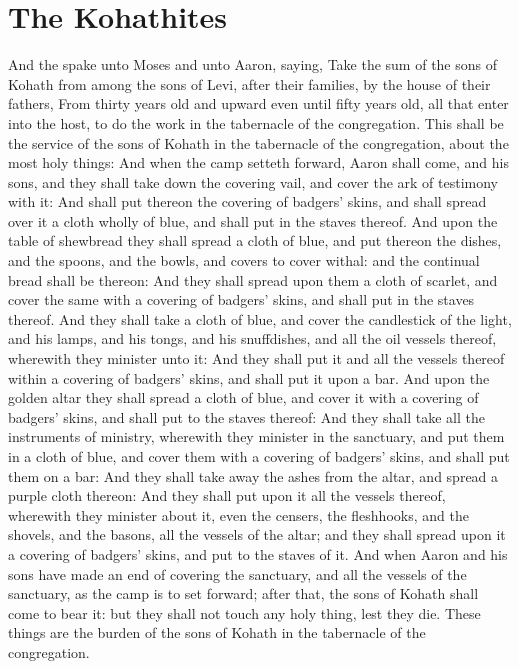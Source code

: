 \section*{The Kohathites}
\begin{biblechapter} %
\verse And the \LORD spake unto Moses and unto Aaron, saying,
\verse Take the sum of the sons of Kohath from among the sons of Levi, after their families, by the house of their fathers,
\verse From thirty years old and upward even until fifty years old, all that enter into the host, to do the work in the tabernacle of the congregation.
\verse This shall be the service of the sons of Kohath in the tabernacle of the congregation, about the most holy things:
\verse And when the camp setteth forward, Aaron shall come, and his sons, and they shall take down the covering vail, and cover the ark of testimony with it:
\verse And shall put thereon the covering of badgers' skins, and shall spread over it a cloth wholly of blue, and shall put in the staves thereof.
\verse And upon the table of shewbread they shall spread a cloth of blue, and put thereon the dishes, and the spoons, and the bowls, and covers to cover withal: and the continual bread shall be thereon:
\verse And they shall spread upon them a cloth of scarlet, and cover the same with a covering of badgers' skins, and shall put in the staves thereof.
\verse And they shall take a cloth of blue, and cover the candlestick of the light, and his lamps, and his tongs, and his snuffdishes, and all the oil vessels thereof, wherewith they minister unto it:
\verse And they shall put it and all the vessels thereof within a covering of badgers' skins, and shall put it upon a bar.
\verse And upon the golden altar they shall spread a cloth of blue, and cover it with a covering of badgers' skins, and shall put to the staves thereof:
\verse And they shall take all the instruments of ministry, wherewith they minister in the sanctuary, and put them in a cloth of blue, and cover them with a covering of badgers' skins, and shall put them on a bar:
\verse And they shall take away the ashes from the altar, and spread a purple cloth thereon:
\verse And they shall put upon it all the vessels thereof, wherewith they minister about it, even the censers, the fleshhooks, and the shovels, and the basons, all the vessels of the altar; and they shall spread upon it a covering of badgers' skins, and put to the staves of it.
\verse And when Aaron and his sons have made an end of covering the sanctuary, and all the vessels of the sanctuary, as the camp is to set forward; after that, the sons of Kohath shall come to bear it: but they shall not touch any holy thing, lest they die. These things are the burden of the sons of Kohath in the tabernacle of the congregation.

\end{biblechapter}

